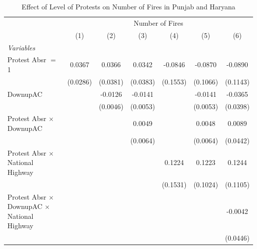 
\begin{table}[htbp]
   \caption{\label{tab:protest_treat_main} Effect of Level of Protests on Number of Fires in Punjab and Haryana}
   \centering
   \begin{tabular}{lcccccc}
      \tabularnewline \midrule \midrule
       & \multicolumn{6}{c}{Number of Fires}\\
                                                                 & (1)           & (2)           & (3)           & (4)           & (5)           & (6)\\  
      \midrule
      \emph{Variables}\\
      Protest Absr $=$ 1                                         & 0.0367        & 0.0366        & 0.0342        & -0.0846       & -0.0870       & -0.0890\\   
                                                                 & (0.0286)      & (0.0381)      & (0.0383)      & (0.1553)      & (0.1066)      & (0.1143)\\   
      DownupAC                                                   &               & -0.0126       & -0.0141       &               & -0.0141       & -0.0365\\   
                                                                 &               & (0.0046)      & (0.0053)      &               & (0.0053)      & (0.0398)\\   
      Protest Absr $\times$ DownupAC                             &               &               & 0.0049        &               & 0.0048        & 0.0089\\   
                                                                 &               &               & (0.0064)      &               & (0.0064)      & (0.0442)\\   
      Protest Absr $\times$ National Highway                     &               &               &               & 0.1224        & 0.1223        & 0.1244\\   
                                                                 &               &               &               & (0.1531)      & (0.1024)      & (0.1105)\\   
      Protest Absr $\times$ DownupAC $\times$ National Highway   &               &               &               &               &               & -0.0042\\   
                                                                 &               &               &               &               &               & (0.0446)\\   

\end{tabular}
\end{table}
